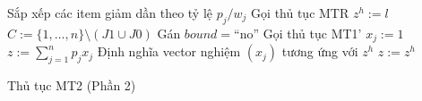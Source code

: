 \begin{algorithm}[H]
    \Else
    {
        Sắp xếp các item giảm dần theo tỷ lệ $p_j / w_j$\;
        Gọi thủ tục MTR\;
        $z^h := l$\;
        $C:= \{1, \dots, n\} \setminus (J1 \cup J0)$\;
        Gán $bound =$``no''\;
        Gọi thủ tục MT1'\;
        {
            $x_j := 1$\;
        }
    }
    $z := \sum_{j = 1}^np_jx_j$\;
    {
        Định nghĩa vector nghiệm $(x_j)$ tương ứng với $z^h$\;
        $z := z^h$\;
    }
    \caption{Thủ tục MT2 (Phần 2)}
    \label{algo:mt2_part2}
\end{algorithm}

